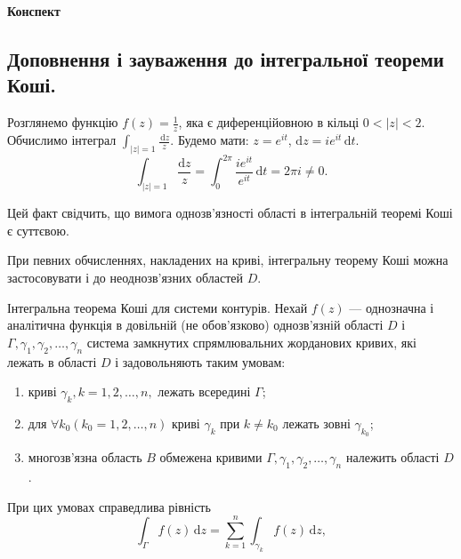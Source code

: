 \documentclass[12pt,fleqn]{article}
\theoremstyle{theorem}
\theoremstyle{proof}
\numberwithin{figure}{section}
\numberwithin{equation}{section}
\begin{document}
\vspace{50mm}

\begin{center}
\Large\bf
Конспект\\[50mm]
{\Huge}
\end{center}

\vspace{50mm}

\newpage

\tableofcontents


\newpage


\subsection{Доповнення і зауваження до інтегральної теореми Коші.}\label{8.4}\allowdisplaybreaks
Розглянемо функцію $f(z)=\frac{1}{z}$, яка є диференційовною в кільці $0<|z|<2$. Обчислимо інтеграл $\int_{|z|=1}\frac{\,\mathrm{d}z}{z}$. Будемо мати: $z=e^{it}$, $\mathrm{d}z=ie^{it}\,\mathrm{d}t$.
\[ \int_{|z|=1}\frac{\mathrm{d}z}{z}=\int_{0}^{2\pi}\frac{ie^{it}}{e^{it}}\,\mathrm{d}t=2\pi i \neq 0.\]

Цей факт свідчить, що вимога однозв'язності області в інтегральній теоремі Коші є суттєвою.

При певних обчисленнях, накладених на криві, інтегральну теорему Коші можна застосовувати і до неоднозв'язних областей $D$.

Інтегральна теорема Коші для системи контурів. Нехай $f(z)$ --- однозначна і аналітична функція в довільній (не обов'язково) однозв'язній області $D$ і $\Gamma, \gamma_1, \gamma_2, \ldots, \gamma_n$ система замкнутих спрямлювальних жорданових кривих, які лежать в області $D$ і задовольняють таким умовам:
\begin{enumerate}
  \item криві $\gamma_k, k = 1, 2, \ldots, n,$ лежать всередині $\Gamma$;
  \item для $\forall k_0(k_0=1,2,\ldots,n)$ криві $\gamma_k$ при $k\neq k_0$ лежать зовні $\gamma_{k_0}$;
  \item многозв'язна область $B$ обмежена кривими $\Gamma, \gamma_1, \gamma_2, \ldots, \gamma_n$ належить області $D$.
\end{enumerate}

При цих умовах справедлива рівність
\begin{equation}\label{8.4.1}
\int_{\Gamma}f(z)\,\mathrm{d}z=\sum_{k=1}^{n}\int_{\gamma_k}f(z)\,\mathrm{d}z,
\end{equation}
\end{document}
